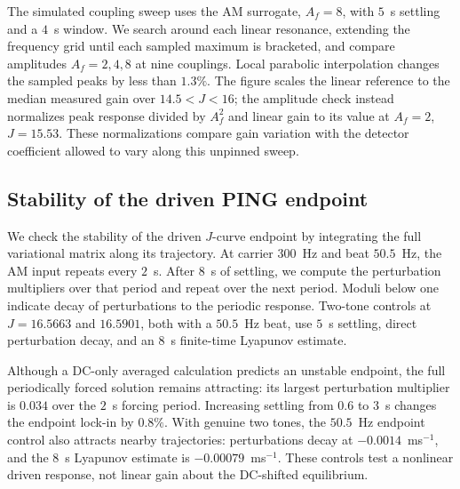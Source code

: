 \documentclass[11pt,a4paper]{article}
\providecommand{\DIFaddtex}[1]{{\protect\color{blue} \sf #1}} %
\providecommand{\DIFaddend}{} %
\providecommand{\DIFadd}[1]{\texorpdfstring{\DIFaddtex{#1}}{#1}} %
\begin{document}
\DIFadd{The simulated coupling sweep uses the AM surrogate, $A_f=8$, with $5$~s
settling and a $4$~s window. We search around each linear resonance, extending
the frequency grid until each sampled maximum is bracketed, and compare
amplitudes $A_f=2,4,8$ at nine couplings. Local parabolic interpolation changes
the sampled peaks by less than $1.3\%$. The figure scales the linear reference
to the median measured gain over $14.5<J<16$; the amplitude check instead
normalizes peak response divided by $A_f^2$ and linear gain to its value at
$A_f=2$, $J=15.53$. These normalizations compare gain variation with the detector coefficient
allowed to vary along this unpinned sweep.
}


\fi

\DIFaddend \subsection{Stability of the driven PING endpoint}\label{app:ping-stability}
We check the stability of the driven $J$-curve endpoint by integrating the full
variational matrix along its trajectory. At carrier $300$~Hz and beat $50.5$~Hz,
the AM input repeats every $2$~s. After $8$~s of settling, we compute the
perturbation multipliers over that period and repeat over the next period.
Moduli below one indicate decay of perturbations to the periodic response.
Two-tone controls at $J=16.5663$ and $16.5901$, both with a $50.5$~Hz beat,
use $5$~s settling, direct perturbation decay, and an $8$~s finite-time
Lyapunov estimate.

Although a DC-only averaged calculation predicts an unstable endpoint, the full
periodically forced solution remains attracting: its largest perturbation
multiplier is $0.034$ over the $2$~s forcing period. Increasing settling from
$0.6$ to $3$~s changes the endpoint lock-in by $0.8\%$. With genuine two tones,
the $50.5$~Hz endpoint control also attracts nearby trajectories: perturbations
decay at $-0.0014$~ms$^{-1}$, and the $8$~s Lyapunov estimate is
$-0.00079$~ms$^{-1}$. These controls test a nonlinear driven response, not linear
gain about the DC-shifted equilibrium.
\end{document}
